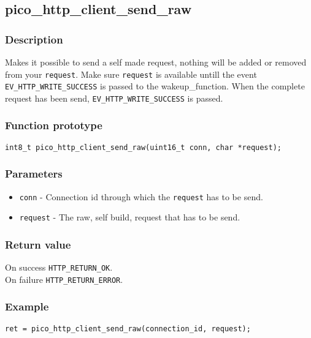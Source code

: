 
\subsection{pico\_http\_client\_send\_raw}

\subsubsection*{Description}
Makes it possible to send a self made request, nothing will be added or removed from your \texttt{request}.
Make sure \texttt{request} is available untill the event \texttt{EV\_HTTP\_WRITE\_SUCCESS} is passed to the wakeup\_function. When the complete request has been send, \texttt{EV\_HTTP\_WRITE\_SUCCESS} is passed.

\subsubsection*{Function prototype}
\texttt{int8\_t pico\_http\_client\_send\_raw(uint16\_t conn, char *request);}

\subsubsection*{Parameters}
\begin{itemize}[noitemsep]
\item \texttt{conn} - Connection id through which the \texttt{request} has to be send.
\item \texttt{request} - The raw, self build, request that has to be send.
\end{itemize}

\subsubsection*{Return value}
On success \texttt{HTTP\_RETURN\_OK}.
\\On failure \texttt{HTTP\_RETURN\_ERROR}.

\subsubsection*{Example}
\begin{verbatim}
ret = pico_http_client_send_raw(connection_id, request);
\end{verbatim}



